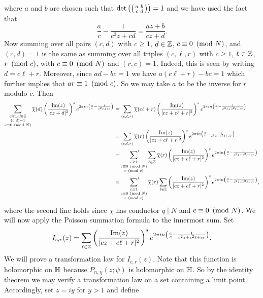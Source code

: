     where $a$ and $b$ are chosen such that $\det\left(\begin{psmallmatrix} a & b \\ c & d \end{psmallmatrix}\right) = 1$ and we have used the fact that
    \[
      \frac{a}{c}-\frac{1}{c^{2}z+cd} = \frac{az+b}{cz+d}.
    \]
    Now summing over all pairs $(c,d)$ with $c \ge 1$, $d \in \mathbb{Z}$, $c \equiv 0 \ \left(\text{mod }N\right)$, and $(c,d) = 1$ is the same as summing over all triples $(c,\ell,r)$ with $c \ge 1$, $\ell \in \mathbb{Z}$, $r \ \left(\text{mod }c\right)$, with $c \equiv 0 \ \left(\text{mod }N\right)$ and $(r,c) = 1$. Indeed, this is seen by writing $d = c\ell+r$. Moreover, since $ad-bc = 1$ we have $a(c\ell+r)-bc = 1$ which further implies that $ar \equiv 1 \ \left(\text{mod }c\right)$. So we may take $a$ to be the inverse for $r$ modulo $c$. Then
    \begin{align*}
      \sum_{\substack{c \ge 1,d \in \mathbb{Z} \\ (c,d) = 1 \\ c \equiv 0 \ \left(\text{mod }N\right)}}\overline{\chi}(d)\left(\frac{\mathrm{Im}(z)}{|cz+d|^{2}}\right)^{s}e^{2\pi in\left(\frac{a}{c}-\frac{1}{c^{2}z+cd}\right)} &= \sum_{(c,\ell,r)}\overline{\chi}(c\ell+r)\left(\frac{\mathrm{Im}(z)}{|cz+c\ell+r|^{2}}\right)^{s}e^{2\pi in\left(\frac{a}{c}-\frac{1}{c^{2}z+c^{2}\ell+cr}\right)} \\
      &= \sum_{(c,\ell,r)}\overline{\chi}(r)\left(\frac{\mathrm{Im}(z)}{|cz+c\ell+r|^{2}}\right)^{s}e^{2\pi in\left(\frac{a}{c}-\frac{1}{c^{2}z+c^{2}\ell+cr}\right)} \\
      &= \sideset{}{'}\sum_{\substack{c \ge 1 \\ c \equiv 0 \ \left(\text{mod }N\right) \\ r \ \left(\text{mod }c\right)}}\sum_{\ell \in \mathbb{Z}}\overline{\chi}(r)\left(\frac{\mathrm{Im}(z)}{|cz+c\ell+r|^{2}}\right)^{s}e^{2\pi in\left(\frac{a}{c}-\frac{1}{c^{2}z+c^{2}\ell+cr}\right)} \\
      &= \sideset{}{'}\sum_{\substack{c \ge 1 \\ c \equiv 0 \ \left(\text{mod }N\right) \\ r \ \left(\text{mod }c\right)}}\overline{\chi}(r)\sum_{\ell \in \mathbb{Z}}\left(\frac{\mathrm{Im}(z)}{|cz+c\ell+r|^{2}}\right)^{s}e^{2\pi in\left(\frac{a}{c}-\frac{1}{c^{2}z+c^{2}\ell+cr}\right)},
    \end{align*}
    where the second line holds since $\chi$ has conductor $q \mid N$ and $c \equiv 0 \ \left(\text{mod }N\right)$. We will now apply the Poisson summation formula to the innermost sum. Set
    \[
      I_{c,r}(z) = \sum_{\ell \in \mathbb{Z}}\left(\frac{\mathrm{Im}(z)}{|cz+c\ell+r|^{2}}\right)^{s}e^{2\pi in\left(\frac{a}{c}-\frac{1}{c^{2}z+c^{2}\ell+cr}\right)}.
    \]
    We will prove a transformation law for $I_{c,r}(z)$. Note that this function is holomorphic on $\mathbb{H}$ because $P_{n,\chi}(z;\psi)$ is holomorphic on $\mathbb{H}$. So by the identity theorem we may verify a transformation law on a set containing a limit point. Accordingly, set $z = iy$ for $y > 1$ and define
